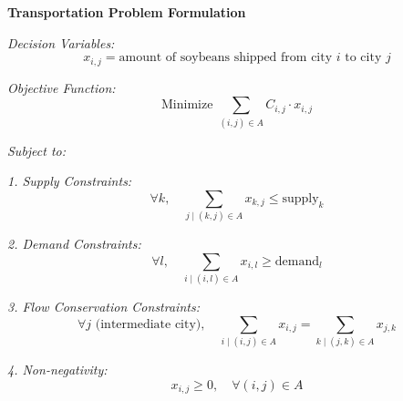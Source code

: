 \documentclass{article}
\begin{document}
\textbf{Transportation Problem Formulation}

\textit{Decision Variables:}
\[
x_{i,j} = \text{amount of soybeans shipped from city } i \text{ to city } j
\]

\textit{Objective Function:}
\[
\text{Minimize } \sum_{(i,j) \in A} C_{i,j} \cdot x_{i,j}
\]

\textit{Subject to:}

\textit{1. Supply Constraints:}
\[
\forall k, \quad \sum_{j \mid (k,j) \in A} x_{k,j} \leq \text{supply}_k
\]

\textit{2. Demand Constraints:}
\[
\forall l, \quad \sum_{i \mid (i,l) \in A} x_{i,l} \geq \text{demand}_l
\]

\textit{3. Flow Conservation Constraints:}
\[
\forall j \text{ (intermediate city)}, \quad 
\sum_{i \mid (i,j) \in A} x_{i,j} = \sum_{k \mid (j,k) \in A} x_{j,k}
\]

\textit{4. Non-negativity:}
\[
x_{i,j} \geq 0, \quad \forall (i,j) \in A
\]
\end{document}
